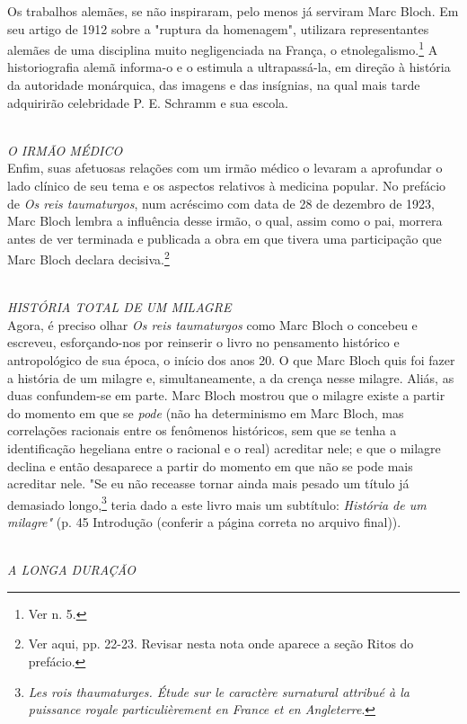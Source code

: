 \documentclass[a5paper]{book}
\begin{document}
Os trabalhos alemães, se não inspiraram, pelo menos já serviram Marc Bloch. Em seu artigo de 1912 sobre a "ruptura da homenagem", utilizara representantes alemães de uma disciplina muito negligenciada na França, o etnolegalismo.\footnote{Ver n. 5.} A historiograf{\kern0pt}ia alemã informa-o e o estimula a ultrapassá-la, em direção à história da autoridade monárquica, das imagens e das insígnias, na qual mais tarde adquirirão celebridade P. E. Schramm e sua escola.

~\\ \large \textit{O IRMÃO MÉDICO} ~\\

Enf{\kern0pt}im, suas afetuosas relações com um irmão médico o levaram a aprofundar o lado clínico de seu tema e os aspectos relativos à medicina popular. No prefácio de \textit{Os reis taumaturgos}, num acréscimo com data de 28 de dezembro de 1923, Marc Bloch lembra a inf{\kern0pt}luência desse irmão, o qual, assim como o pai, morrera antes de ver terminada e publicada a obra em que tivera uma participação que Marc Bloch declara decisiva.\footnote{Ver aqui, pp. 22-23. Revisar nesta nota onde aparece a seção Ritos do prefácio.}

~\\ \large \textit{HISTÓRIA TOTAL DE UM MILAGRE} ~\\

Agora, é preciso olhar \textit{Os reis taumaturgos} como Marc Bloch o concebeu e escreveu, esforçando-nos por reinserir o livro no pensamento histórico e antropológico de sua época, o início dos anos 20.
O que Marc Bloch quis foi fazer a história de um milagre e, simultaneamente, a da crença nesse milagre. Aliás, as duas confundem-se em parte. Marc Bloch mostrou que o milagre existe a partir do momento em que se \textit{pode} (não ha determinismo em Marc Bloch, mas correlações racionais entre os fenômenos históricos, sem que se tenha a identif{\kern0pt}icação hegeliana entre o racional e o real) acreditar nele; e que o milagre declina e então desaparece a partir do momento em que não se pode mais acreditar nele. "Se eu não receasse tornar ainda mais pesado um título já demasiado longo,\footnote{\textit{Les rois thaumaturges. Étude sur le caractère surnatural attribué à la puissance royale particulièrement en France et en Angleterre}.} teria dado a este livro mais um subtítulo: \textit{História de um milagre"} (p. 45 Introdução (conferir a página correta no arquivo f{\kern0pt}inal)).

~\\ \large \textit{A LONGA DURAÇÃO} ~\\
\end{document}
